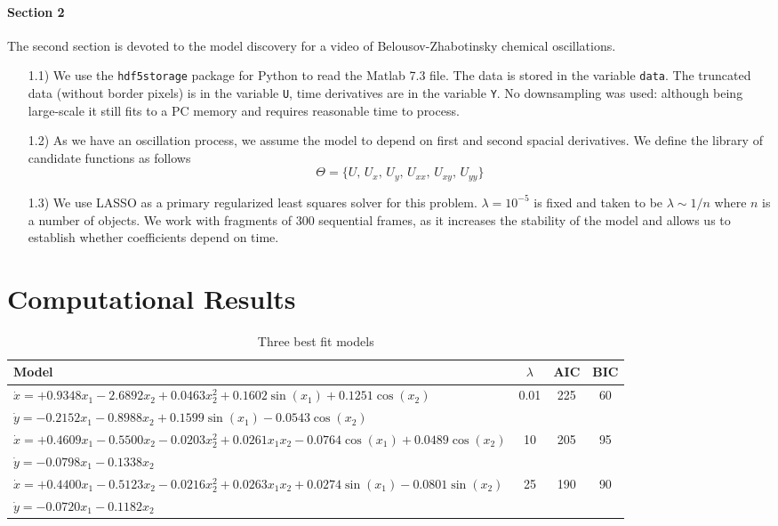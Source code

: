 \documentclass{article}
\begin{document}
\paragraph{Section 2} The second section is devoted to the model discovery for a video of Belousov-Zhabotinsky chemical oscillations. 
\begin{enumerate}
\item[1.1)] We use the \texttt{hdf5storage} package for Python to read the Matlab 7.3 file. The data is stored in the variable \texttt{data}. The truncated data (without border pixels) is in the variable \texttt{U}, time derivatives are in the variable \texttt{Y}. No downsampling was used: although being large-scale it still fits to a PC memory and requires reasonable time to process.  
\item[1.2)] As we have an oscillation process, we assume the model to depend on first and second spacial derivatives. We define the library of candidate functions as follows
    \[
        \Theta = \{U,\, U_x,\, U_y,\, U_{xx},\, U_{xy},\, U_{yy}\}
    \]
    
\item[1.3)] We use LASSO as a primary regularized least squares solver for this problem. $\lambda = 10^{-5}$ is fixed and taken to be $\lambda \sim 1/n$ where $n$ is a number of objects. We work with fragments of 300 sequential frames, as it increases the stability of the model and allows us to establish whether coefficients depend on time.
\end{enumerate}
\section{Computational Results}

   \begin{table}
            \centering
            \begin{tabular}{lccc}
                \textbf{Model} & \textbf{$\lambda$} & \textbf{AIC} & \textbf{BIC} \\
                \hline
                $\dot{x} = +0.9348x_1-2.6892x_2+0.0463x_2^2+0.1602\sin(x_1)+0.1251\cos(x_2)$ & 0.01 & 225 & 60 \\
                $\dot{y} =-0.2152x_1-0.8988x_2+0.1599\sin(x_1)-0.0543\cos(x_2)$ & & & \\
                $\dot{x} = +0.4609x_1-0.5500x_2-0.0203x_2^2+0.0261x_1 x_2-0.0764\cos(x_1)+0.0489\cos(x_2)$ & 10 & 205 & 95 \\
                $\dot{y} = -0.0798x_1-0.1338x_2$ & & & \\
                $\dot{x} = +0.4400x_1-0.5123x_2-0.0216x_2^2+0.0263x_1 x_2+0.0274\sin(x_1)-0.0801\sin(x_2)$ & 25 & 190 & 90 \\
                $\dot{y} = -0.0720x_1-0.1182x_2$ 
            \end{tabular}
            \caption{\label{table:best_fit_models}Three best fit models}
        \end{table}
        
\end{document}
